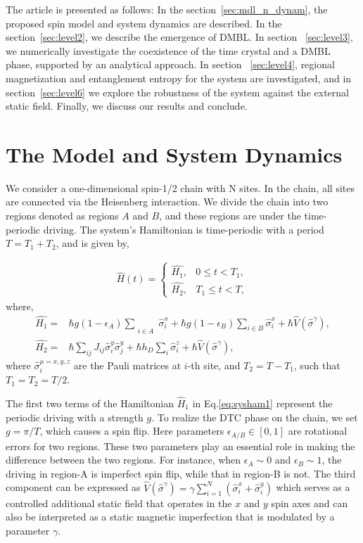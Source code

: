 \documentclass[%
reprint,
superscriptaddress,
amsmath,amssymb,showkeys,
aps,
prb,
]{revtex4-2}
\begin{document}
	The article is presented as follows: In the section~\ref{sec:mdl_n_dynam}, the proposed spin model and system dynamics are described. In the section~\ref{sec:level2}, we describe the emergence of DMBL. In section ~\ref{sec:level3}, we numerically investigate the coexistence of the time crystal and a DMBL phase, supported by an analytical approach. In section ~\ref{sec:level4}, regional magnetization and  entanglement entropy for the system are investigated, and in section~\ref{sec:level6} we explore the robustness of the system against the external static field. Finally, we discuss our results and conclude.	
	
	\section{\label{sec:mdl_n_dynam} The Model and System Dynamics}
	We consider a one-dimensional spin-1/2 chain with N sites. In the chain, all sites are connected via the Heisenberg interaction. We divide the chain into two regions denoted as regions $A$ and $B$, and these regions are under the time-periodic driving. The system's Hamiltonian is time-periodic with a period $T=T_1+T_2$, and is given by,
	
	\begin{align}
		\hat{H}(t) = 
		\begin{cases}
			\hat{H_1} , & 0\leq t < T_1,\\
			\hat{H_2} , & T_1\leq t < T,
		\end{cases}
		\label{eq:cleanham}
	\end{align}
	where,
	\begin{align}
		\hat{H_1} = & \hbar g (1-\epsilon_A) \sum_{\substack{\\i \in A}}\hat{\sigma}^x_i + \hbar g (1-\epsilon_B) \sum_{i \in B}\hat{\sigma}^x_i+ \hbar\hat{V}(\hat{\sigma}^{\gamma}),\label{eq:sysham1}\\
		\hat{H_2} = & \hbar\sum_{ij} J_{ij} \hat{\sigma}^y_i \hat{\sigma}^y_{j} +  \hbar h_D \sum_i \hat{\sigma}^z_i + \hbar\hat{V}(\hat{\sigma}^{\gamma}),
		\label{eq:sysham2}
	\end{align}
	where $\hat{\sigma}^{\mu=x,y,z}_i$ are the Pauli matrices at $i$-th site, and $T_2 = T-T_1$, such that $T_1=T_2=T/2$. 
	
	The first two terms of the Hamiltonian $\hat{H}_1$ in Eq.\eqref{eq:sysham1} represent the periodic driving with a strength $g$. To realize the DTC phase on the chain, we set $g=\pi/T$, which causes a spin flip. Here parameters $\epsilon_{A/B}\in[0,1]$ are rotational errors for two regions. These two parameters play an essential role in making the difference between the two regions. For instance, when $\epsilon_A \sim 0$ and $\epsilon_B \sim 1$, the driving in region-A is imperfect spin flip, while that in region-B is not. The third component can be expressed as $\displaystyle \hat{V}(\hat{\sigma}^{\gamma}) =\gamma  \sum_{i=1}^{N} (\hat{\sigma}^x_i + \hat{\sigma}^y_i)$ which serves as a controlled additional static field that operates in the $x$ and $y$ spin axes and can also be interpreted as a static magnetic imperfection that is modulated by a parameter $\gamma$.
	
\end{document}
